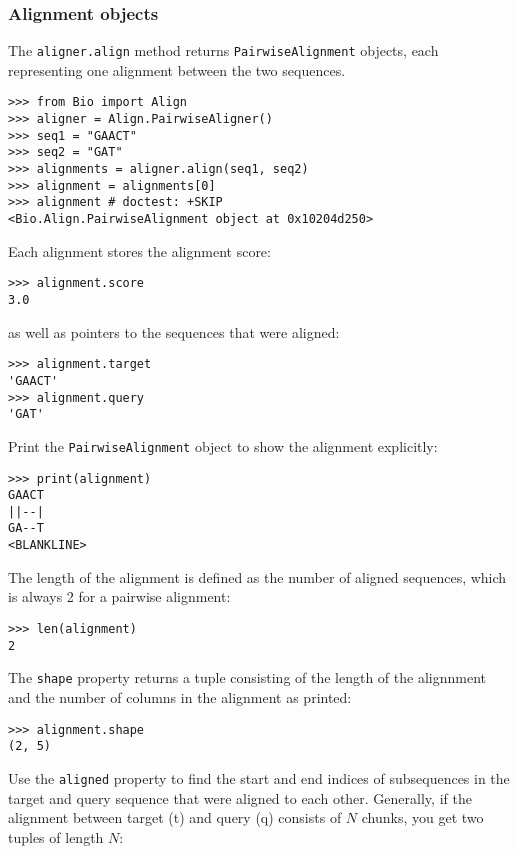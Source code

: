 \subsubsection{Alignment objects}
The \verb+aligner.align+ method returns \verb+PairwiseAlignment+ objects, each representing one alignment between the two sequences.

\begin{verbatim}
>>> from Bio import Align
>>> aligner = Align.PairwiseAligner()
>>> seq1 = "GAACT"
>>> seq2 = "GAT"
>>> alignments = aligner.align(seq1, seq2)
>>> alignment = alignments[0]
>>> alignment # doctest: +SKIP
<Bio.Align.PairwiseAlignment object at 0x10204d250>
\end{verbatim}

Each alignment stores the alignment score:

\begin{verbatim}
>>> alignment.score
3.0
\end{verbatim}
as well as pointers to the sequences that were aligned:

\begin{verbatim}
>>> alignment.target
'GAACT'
>>> alignment.query
'GAT'
\end{verbatim}

Print the \verb+PairwiseAlignment+ object to show the alignment explicitly:

\begin{verbatim}
>>> print(alignment)
GAACT
||--|
GA--T
<BLANKLINE>
\end{verbatim}

The length of the alignment is defined as the number of aligned sequences,
which is always 2 for a pairwise alignment:

\begin{verbatim}
>>> len(alignment)
2
\end{verbatim}

The \verb+shape+ property returns a tuple consisting of the length of the
alignnment and the number of columns in the alignment as printed:

\begin{verbatim}
>>> alignment.shape
(2, 5)
\end{verbatim}

Use the \verb+aligned+ property to find the start and end indices of subsequences in the target and query sequence that were aligned to each other.
Generally, if the alignment between target (t) and query (q) consists of $N$
chunks, you get two tuples of length $N$:

